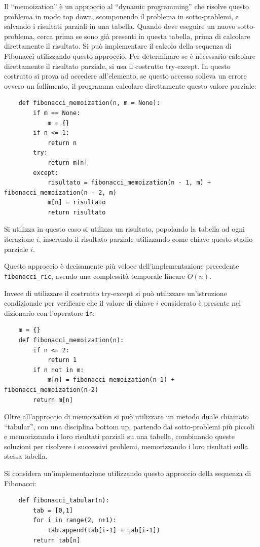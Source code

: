 \documentclass{article}
\numberwithin{equation}{subsection}
\begin{document}
Il ``memoization'' è un approccio al ``dynamic programming'' che risolve questo problema in modo 
top down, scomponendo il problema in sotto-problemi, e salvando i risultati parziali in una 
tabella. Quando deve eseguire un nuovo sotto-problema, cerca prima se sono già presenti in questa 
tabella, prima di calcolare direttamente il risultato. 
Si può implementare il calcolo della sequenza di Fibonacci utilizzando questo approccio. Per 
determinare se è necessario calcolare direttamente il risultato parziale, si usa il costrutto 
try-except. In questo costrutto si prova ad accedere all'elemento, se questo accesso solleva 
un errore ovvero un fallimento, il programma calcolare direttamente questo valore parziale:

\begin{verbatim}
    def fibonacci_memoization(n, m = None):
        if m == None:
            m = {}
        if n <= 1:
            return n
        try: 
            return m[n]
        except:
            risultato = fibonacci_memoization(n - 1, m) + fibonacci_memoization(n - 2, m)
            m[n] = risultato
            return risultato
\end{verbatim}

Si utilizza in questo caso si utilizza un risultato, popolando la tabella ad ogni iterazione $i$, 
inserendo il risultato parziale utilizzando come chiave questo stadio parziale $i$. 

Questo approccio è decisamente più veloce dell'implementazione precedente \verb|fibonacci_ric|, 
avendo una complessità temporale lineare $O(n)$. 

Invece di utilizzare il costrutto try-except si può utilizzare un'istruzione condizionale 
per verificare che il valore di chiave $i$ considerato è presente nel dizionario con 
l'operatore \verb|in|:
\begin{verbatim}
    m = {}
    def fibonacci_memoization(n):
        if n <= 2:
            return 1
        if n not in m:
            m[n] = fibonacci_memoization(n-1) + fibonacci_memoization(n-2)
        return m[n]
\end{verbatim}

Oltre all'approccio di memoization si può utilizzare un metodo duale chiamato ``tabular'', 
con una disciplina bottom up, partendo dai sotto-problemi più piccoli e memorizzando i loro 
risultati parziali su una tabella, combinando queste soluzioni per risolvere i successivi 
problemi, memorizzando i loro risultati sulla stessa tabella. 

Si considera un'implementazione utilizzando questo approccio della sequenza di Fibonacci:
\begin{verbatim}
    def fibonacci_tabular(n):
        tab = [0,1]
        for i in range(2, n+1):
            tab.append(tab[i-1] + tab[i-1])
        return tab[n]
\end{verbatim}
\end{document}
